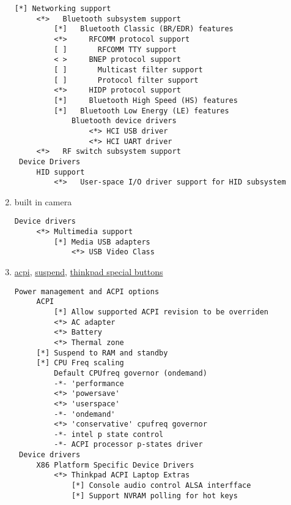 \documentclass[10pt,a4paper]{article}
\begin{document}
\begin{enumerate}
                    \begin{lstlisting}[style=KernelConfig]
 [*] Networking support
     <*>   Bluetooth subsystem support
         [*]   Bluetooth Classic (BR/EDR) features
         <*>     RFCOMM protocol support
         [ ]       RFCOMM TTY support
         < >     BNEP protocol support
         [ ]       Multicast filter support
         [ ]       Protocol filter support
         <*>     HIDP protocol support
         [*]     Bluetooth High Speed (HS) features
         [*]   Bluetooth Low Energy (LE) features
             Bluetooth device drivers
                 <*> HCI USB driver
                 <*> HCI UART driver
     <*>   RF switch subsystem support
 Device Drivers
     HID support
         <*>   User-space I/O driver support for HID subsystem
                    \end{lstlisting}
                    
                    \newpage
                    \item built in camera
                    \begin{lstlisting}[style=KernelConfig]
 Device drivers                    
     <*> Multimedia support
         [*] Media USB adapters
             <*> USB Video Class
                    \end{lstlisting}
                    
                    \newpage
                    \item \href{https://wiki.gentoo.org/wiki/ACPI#Kernel}{acpi}, \href{https://wiki.gentoo.org/wiki/Suspend_and_hibernate}{suspend}, \href{https://wiki.gentoo.org/wiki/ACPI/ThinkPad-special-buttons#Preparation}{thinkpad special buttons}

                        \begin{lstlisting}[style=KernelConfig]
 Power management and ACPI options
     ACPI
         [*] Allow supported ACPI revision to be overriden
         <*> AC adapter
         <*> Battery
         <*> Thermal zone
     [*] Suspend to RAM and standby
     [*] CPU Freq scaling
         Default CPUfreq governor (ondemand)
         -*- 'performance
         <*> 'powersave'
         <*> 'userspace'
         -*- 'ondemand'
         <*> 'conservative' cpufreq governor
         -*- intel p state control
         -*- ACPI processor p-states driver
 Device drivers
     X86 Platform Specific Device Drivers
         <*> Thinkpad ACPI Laptop Extras
             [*] Console audio control ALSA interfface
             [*] Support NVRAM polling for hot keys
                        \end{lstlisting}
                    

\end{enumerate}
\end{document}
